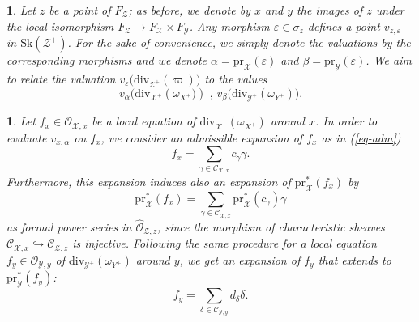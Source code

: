 \documentclass{amsart}%
\numberwithin{equation}{subsection}
\theoremstyle{plain2}
\theoremstyle{definition2}
\theoremstyle{stepstyle}
\theoremstyle{point}
\theoremstyle{subpoint}
\newtheorem{subpoint}[equation]{}%
\newcommand{\spa}[1]{\begin{subpoint}#1\end{subpoint}}           %
\newcommand{\cX}{\ensuremath{\mathscr{X}}}
\newcommand{\caC}{\ensuremath{\mathcal{C}}}
\newcommand{\caO}{\ensuremath{\mathcal{O}}}
\newcommand{\cY}{\ensuremath{\mathscr{Y}}}
\newcommand{\cZ}{\ensuremath{\mathscr{Z}}}
\renewcommand{\cZ}{\ensuremath{\mathscr{Z}}}
\renewcommand{\cY}{\ensuremath{\mathscr{Y}}}
\newcommand{\pr}{\mathrm{pr}}
\newcommand{\divisor}{\mathrm{div}}
\newcommand{\Sk}{\mathrm{Sk}}
\begin{document}
\spa{Let $z$ be a point of $F_{\cZ}$; as before, we denote by $x$ and $y$ the images of $z$ under the local isomorphism $F_{\cZ} \rightarrow F_{\cX} \times F_{\cY}$. Any morphism $\varepsilon \in \sigma_z$ defines a point $v_{z,\varepsilon}$ in $\Sk(\cZ^+)$. For the sake of convenience, we simply denote the valuations by the corresponding morphisms and we denote $\alpha= \pr_{\cX}(\varepsilon)$ and $\beta=\pr_{\cY}(\varepsilon)$. We aim to relate the valuation $v_{\varepsilon}\big(\divisor_{\cZ^+}(\varpi)\big)$ to the values $$v_{\alpha}\big(\divisor_{\cX^+}(\omega_{X^+}\big)) \text{ , } v_{\beta}\big(\divisor_{\cY^+}(\omega_{Y^+})\big).$$}

\spa{Let $f_x \in \caO_{\cX,x}$ be a local equation of $\divisor_{\cX^+}(\omega_{X^+})$ around $x$. In order to evaluate $v_{x,\alpha}$ on $f_x$, we consider an admissible expansion of $f_x$ as in (\ref{eq-adm}) $$f_x=\sum_{\gamma\in \caC_{\cX,x}}c_\gamma \gamma.$$ Furthermore, this expansion induces also an expansion of $\pr_{\cX}^*(f_x)$ by  $$\pr_{\cX}^*(f_x)=\sum_{\gamma\in \caC_{\cX,x} }\pr^*_{\cX}(c_\gamma) \gamma$$ as formal power series in $\widehat{\caO}_{\cZ,z}$, since the morphism of characteristic sheaves $\mathcal{C}_{\cX,x} \hookrightarrow \mathcal{C}_{\cZ,z}$ is injective. Following the same procedure for a local equation $f_y \in \caO_{\cY,y}$ of $\divisor_{\cY^+}(\omega_{Y^+})$ around $y$, we get an expansion of $f_y$ that extends to $\pr_{\cY}^*(f_y)$: 
$$f_y=\sum_{\delta\in \caC_{\cY,y}}d_\delta \delta.$$}
\end{document}
